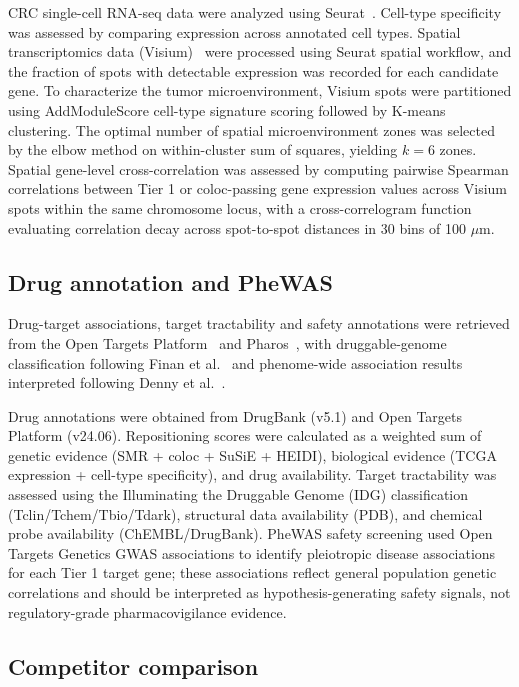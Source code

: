 \documentclass[11pt,a4paper]{article}
\begin{document}
CRC single-cell RNA-seq data were analyzed using Seurat~\cite{hao2021seurat}. Cell-type
specificity was assessed by comparing expression across annotated cell types.
Spatial transcriptomics data (Visium)~\cite{stahl2016spatial} were processed using Seurat spatial
workflow, and the fraction of spots with detectable expression was recorded for
each candidate gene. To characterize the tumor
microenvironment, Visium spots were partitioned using AddModuleScore
cell-type signature scoring followed by K-means clustering. The optimal number
of spatial microenvironment zones was selected by the elbow method on
within-cluster sum of squares, yielding $k=6$ zones. Spatial gene-level
cross-correlation was assessed by computing pairwise Spearman correlations
between Tier 1 or coloc-passing gene expression values across Visium spots
within the same chromosome locus, with a cross-correlogram function evaluating
correlation decay across spot-to-spot distances in 30 bins of 100 $\mu$m.

\subsection{Drug annotation and PheWAS}

Drug-target associations, target tractability and safety annotations were
retrieved from the Open Targets Platform~\cite{buniello2025opentargets} and
Pharos~\cite{kelleher2023pharos}, with druggable-genome classification
following Finan et al.~\cite{finan2017druggable} and phenome-wide association
results interpreted following Denny et al.~\cite{denny2010phewas}.

Drug annotations were obtained from DrugBank (v5.1) and Open Targets Platform
(v24.06). Repositioning scores were calculated as a weighted sum of genetic
evidence (SMR + coloc + SuSiE + HEIDI), biological evidence (TCGA expression
+ cell-type specificity), and drug availability. Target tractability was
assessed using the Illuminating the Druggable Genome (IDG) classification
(Tclin/Tchem/Tbio/Tdark), structural data availability (PDB), and chemical
probe availability (ChEMBL/DrugBank). PheWAS safety screening used Open
Targets Genetics GWAS associations to identify pleiotropic disease
associations for each Tier 1 target gene; these associations reflect general
population genetic correlations and should be interpreted as hypothesis-generating
safety signals, not regulatory-grade pharmacovigilance evidence.

\subsection{Competitor comparison}
\end{document}
